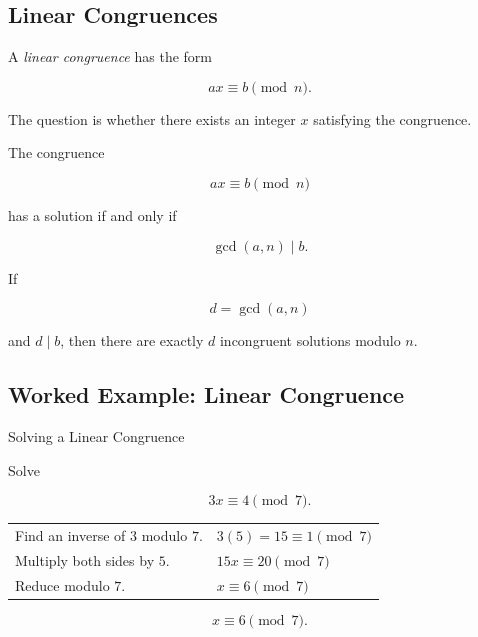 \subsection{Linear Congruences}
\label{subsec:linear-congruences}

A \emph{linear congruence} has the form

\[ ax\equiv b\pmod n. \]

The question is whether there exists an integer \(x\) satisfying the
congruence.

\begin{theorem}
The congruence

\[ ax\equiv b\pmod n \]

has a solution if and only if

\[ \gcd(a,n)\mid b. \]
\end{theorem}

If

\[ d=\gcd(a,n) \]

and \(d\mid b\), then there are exactly \(d\) incongruent solutions modulo
\(n\).

\subsection{Worked Example: Linear Congruence}
\label{subsec:worked-linear-congruence}

\begin{workedexamplebox}{Solving a Linear Congruence}

Solve

\[ 3x\equiv4\pmod7. \]

\begin{tabularx}{\textwidth}{@{}>{\raggedright\arraybackslash}p{}X@{}}
Find an inverse of \(3\) modulo \(7\). &
\(3(5)=15\equiv1\pmod7\)\\
Multiply both sides by \(5\). &
\(15x\equiv20\pmod7\)\\
Reduce modulo \(7\). &
\(x\equiv6\pmod7\)
\end{tabularx}

\begin{answerbox}
\[ \boxed{x\equiv6\pmod7.} \]
\end{answerbox}
\end{workedexamplebox}

